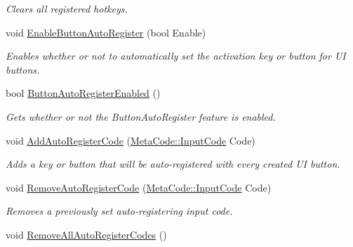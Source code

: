 \begin{DoxyCompactItemize}
\begin{DoxyCompactList}\small\item\em Clears all registered hotkeys. \item\end{DoxyCompactList}\item 
void \hyperlink{classphys_1_1UIManager_a210e1607f0fa63aa44a1f7a6b4156f60}{EnableButtonAutoRegister} (bool Enable)
\begin{DoxyCompactList}\small\item\em Enables whether or not to automatically set the activation key or button for UI buttons. \item\end{DoxyCompactList}\item 
bool \hyperlink{classphys_1_1UIManager_aa55bfb557af6569914662e3786b86a7a}{ButtonAutoRegisterEnabled} ()
\begin{DoxyCompactList}\small\item\em Gets whether or not the ButtonAutoRegister feature is enabled. \item\end{DoxyCompactList}\item 
void \hyperlink{classphys_1_1UIManager_ac44c38c26dece8a5d2087cb9ab2eac15}{AddAutoRegisterCode} (\hyperlink{classphys_1_1MetaCode_a3e501cbb5bf0f6f1fdb7211465bda8d8}{MetaCode::InputCode} Code)
\begin{DoxyCompactList}\small\item\em Adds a key or button that will be auto-\/registered with every created UI button. \item\end{DoxyCompactList}\item 
void \hyperlink{classphys_1_1UIManager_a0335a3ee8134edf514222896790a71d1}{RemoveAutoRegisterCode} (\hyperlink{classphys_1_1MetaCode_a3e501cbb5bf0f6f1fdb7211465bda8d8}{MetaCode::InputCode} Code)
\begin{DoxyCompactList}\small\item\em Removes a previously set auto-\/registering input code. \item\end{DoxyCompactList}\item 
\hypertarget{classphys_1_1UIManager_a006ae9f06562877b0a7fe315c25d96a0}{
void \hyperlink{classphys_1_1UIManager_a006ae9f06562877b0a7fe315c25d96a0}{RemoveAllAutoRegisterCodes} ()}
\label{classphys_1_1UIManager_a006ae9f06562877b0a7fe315c25d96a0}


\end{DoxyCompactItemize}

